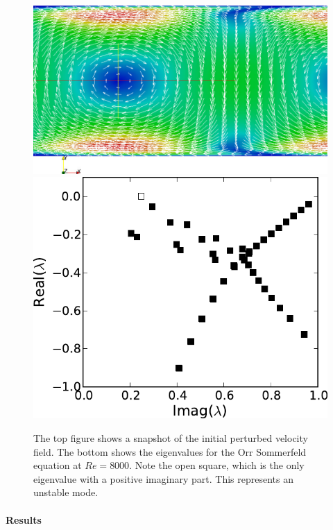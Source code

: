 \begin{figure}
  \centering
  \includegraphics[width=\twofigs]{chapters/mortensen/pdf/OS_init.pdf}
  \includegraphics[width=\twofigs]{chapters/mortensen/pdf/OrrS_eigvals.pdf}
  \caption{The top figure shows a snapshot of the initial perturbed velocity
    field. The bottom shows the eigenvalues for the Orr Sommerfeld equation
    at $Re=8000$. Note the open square, which is the only eigenvalue
    with a positive imaginary part. This represents an unstable mode.}
  \label{fig:mortensen:OS_init}
\end{figure}

\paragraph{Results}

